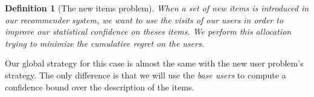 \documentclass[twoside,leqno,twocolumn]{article}
\newtheorem{mydef}{Definition}
\begin{document}
\begin{mydef}[The new items problem]
When a set of new items is introduced in our recommender system, we want to use the visits of our users in order to improve our statistical confidence on theses items. We perform this allocation trying to minimize the cumulative regret on the users.  
\end{mydef}

Our global strategy for this case is almost the same with the new user problem's strategy. The only difference is that we will use the \emph{base users} to compute a confidence bound over the description of the items. 

%
 
\end{document}
